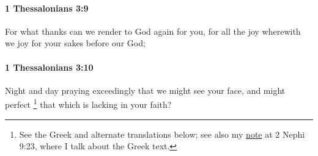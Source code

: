 		\paragraph{1 Thessalonians 3:9} %
			\label{1THESSALONIANS-3-9}

			For what thanks can we render to God again for you, for all the joy wherewith we joy for your sakes before our God;

			\begin{framed}
			\scriptsize
				\begin{compactdesc}
					\item[SBLG] 
				\end{compactdesc}
			\end{framed}

		\paragraph{1 Thessalonians 3:10} %
			\label{1THESSALONIANS-3-10}

			Night and day praying exceedingly that we might see your face, and might perfect%
				\footnote{%
					\label{1THESSALONIANS-3-10-perfect}%
					See the Greek and alternate translations below; see also my \hyperref[2NEPHI-9-23-perfect]{note} at 2 Nephi 9:23, where I talk about the Greek text.
					}
			that which is lacking in your faith?
			
